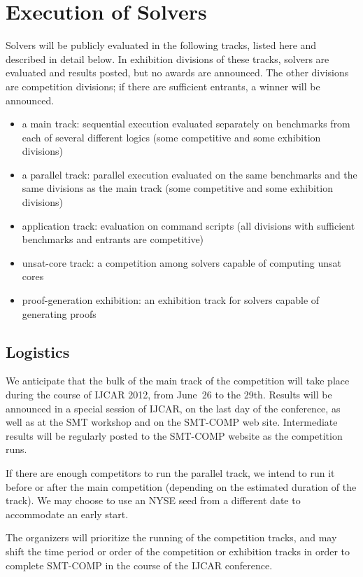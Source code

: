 \documentclass[12pt]{article}
\begin{document}
\section{Execution of Solvers}
\label{sec:exec}

Solvers will be publicly evaluated in the following tracks, listed here and 
described in detail below. In exhibition divisions of these tracks, solvers are evaluated and results posted, but no awards are announced. The other divisions are competition divisions; if there are sufficient entrants, a winner will be announced.
\begin{itemize}
\item a main track: sequential execution evaluated separately on benchmarks from each of several different logics (some competitive and some exhibition divisions)
\item a parallel track: parallel execution evaluated on the same benchmarks and the same divisions as the main track (some competitive and some exhibition divisions)
\item application track: evaluation on command scripts (all divisions with sufficient benchmarks and entrants are competitive)
\item unsat-core track: a competition among solvers capable of computing unsat cores
\item proof-generation exhibition: an exhibition track for solvers capable of generating proofs
\end{itemize}

\subsection{Logistics}

%
We anticipate that the bulk of the main track of the competition will take place during
the course of IJCAR 2012, from June~26 to the 29th.  Results will be
announced in a special session of IJCAR, on the last day of the
conference, as well as at the SMT workshop and on the SMT-COMP web site.  Intermediate results
will be regularly posted to the SMT-COMP website as the competition
runs.

If there are enough competitors to run the parallel track, we intend
to run it before or after the main competition (depending on the
estimated duration of the track). We may choose to use an NYSE seed from a different date
to accommodate an early start.

The organizers will prioritize the running of the competition tracks, and may shift the
time period or order of the competition or exhibition tracks in order to complete SMT-COMP
in the course of the IJCAR conference.
\end{document}
